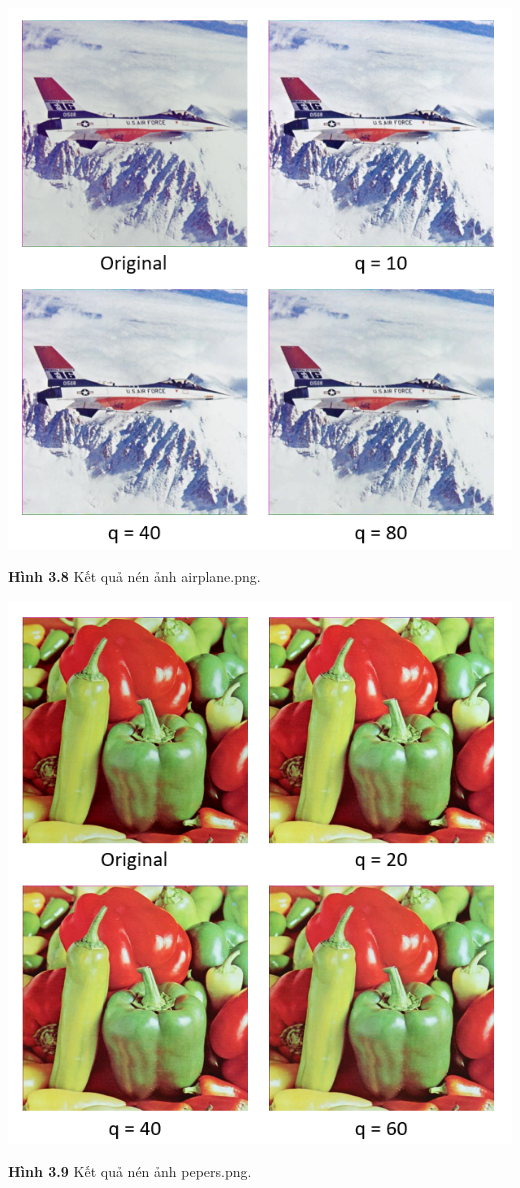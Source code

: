 \begin{center}
    \includegraphics[scale=0.53]{Figures/fig26.png}
    \par \textbf {Hình 3.8} Kết quả nén ảnh airplane.png.
\end{center}
\begin{center}
    \includegraphics[scale=0.53]{Figures/fig28.png}
    \par \textbf {Hình 3.9} Kết quả nén ảnh pepers.png.
\end{center}
